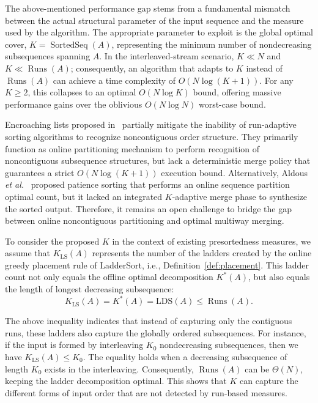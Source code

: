 \documentclass{ieeeaccess}
\theoremstyle{plain}
\theoremstyle{definition}
\DeclareMathOperator{\Runs}{Runs}
\DeclareMathOperator{\SortedSeq}{SortedSeq}
\begin{document}
The above-mentioned performance gap stems from a fundamental mismatch between the actual structural parameter of the input sequence and the measure used by the algorithm. The appropriate parameter to exploit is the global optimal cover, $K = \SortedSeq(A)$, representing the minimum number of nondecreasing subsequences spanning $A$. In the interleaved-stream scenario, $K \ll N$ and $K \ll \Runs(A)$; consequently, an algorithm that adapts to $K$ instead of $\Runs(A)$ can achieve a time complexity of $O(N \log (K + 1))$. For any $K \ge 2$, this collapses to an optimal $O(N \log K)$ bound, offering massive performance gains over the oblivious $O(N \log N)$ worst-case bound.

Encroaching lists proposed in~\cite{Skiena1988} partially mitigate the inability of run-adaptive sorting algorithms to recognize noncontiguous order structure. They primarily function as online partitioning mechanism to perform recognition of noncontiguous subsequence structures, but lack a deterministic merge policy that guarantees a strict $O(N \log (K + 1))$ execution bound. Alternatively, Aldous \emph{et al.}~\cite{AldousDiaconis1999} proposed patience sorting that performs an online sequence partition optimal count, but it lacked an integrated $K$-adaptive merge phase to synthesize the sorted output. Therefore, it remains an open challenge to bridge the gap between online noncontiguous partitioning and optimal multiway merging.
 
To consider the proposed $K$ in the context of existing presortedness measures, we assume that $K_{\mathrm{LS}}(A)$ represents the number of the ladders created by the online greedy placement rule of LadderSort, i.e., Definition~\ref{def:placement}. This ladder count not only equals the  offline optimal decomposition $K^*(A)$, but also equals the length of longest decreasing subsequence:
%
\[
K_{\mathrm{LS}}(A)=K^*(A)=\mathrm{LDS}(A)\le \Runs(A).
\]
%

The above inequality indicates that instead of capturing only the contiguous runs, these ladders also capture the globally ordered subsequences. For instance, if the input is formed by interleaving $K_0$ nondecreasing subsequences, then we have $K_{\mathrm{LS}}(A)\le K_0$. The equality holds when a decreasing subsequence of length $K_0$ exists in the interleaving. Consequently, $\Runs(A)$ can be $\Theta(N)$, keeping the ladder decomposition optimal. This shows that $K$ can capture the different forms of input order  that are not detected by run-based measures.
\end{document}
